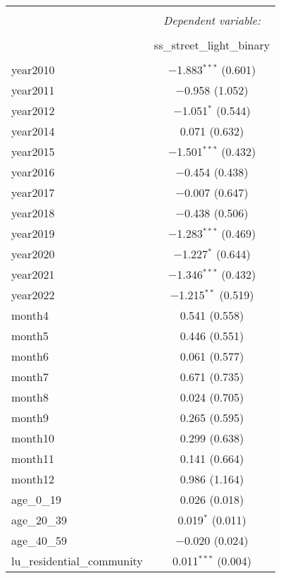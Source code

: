 \begin{table}[!htbp] \centering 
  \caption{} 
  \label{} 
\small 
\begin{tabular}{@{\extracolsep{1pt}}lc} 
\\[-1.8ex]\hline 
\hline \\[-1.8ex] 
 & \multicolumn{1}{c}{\textit{Dependent variable:}} \\ 
\cline{2-2} 
\\[-1.8ex] & ss\_street\_light\_binary \\ 
\hline \\[-1.8ex] 
 year2010 & $-$1.883$^{***}$ (0.601) \\ 
  year2011 & $-$0.958 (1.052) \\ 
  year2012 & $-$1.051$^{*}$ (0.544) \\ 
  year2014 & 0.071 (0.632) \\ 
  year2015 & $-$1.501$^{***}$ (0.432) \\ 
  year2016 & $-$0.454 (0.438) \\ 
  year2017 & $-$0.007 (0.647) \\ 
  year2018 & $-$0.438 (0.506) \\ 
  year2019 & $-$1.283$^{***}$ (0.469) \\ 
  year2020 & $-$1.227$^{*}$ (0.644) \\ 
  year2021 & $-$1.346$^{***}$ (0.432) \\ 
  year2022 & $-$1.215$^{**}$ (0.519) \\ 
  month4 & 0.541 (0.558) \\ 
  month5 & 0.446 (0.551) \\ 
  month6 & 0.061 (0.577) \\ 
  month7 & 0.671 (0.735) \\ 
  month8 & 0.024 (0.705) \\ 
  month9 & 0.265 (0.595) \\ 
  month10 & 0.299 (0.638) \\ 
  month11 & 0.141 (0.664) \\ 
  month12 & 0.986 (1.164) \\ 
  age\_0\_19 & 0.026 (0.018) \\ 
  age\_20\_39 & 0.019$^{*}$ (0.011) \\ 
  age\_40\_59 & $-$0.020 (0.024) \\ 
  lu\_residential\_community & 0.011$^{***}$ (0.004) \\ 

\end{tabular}
\end{table}
